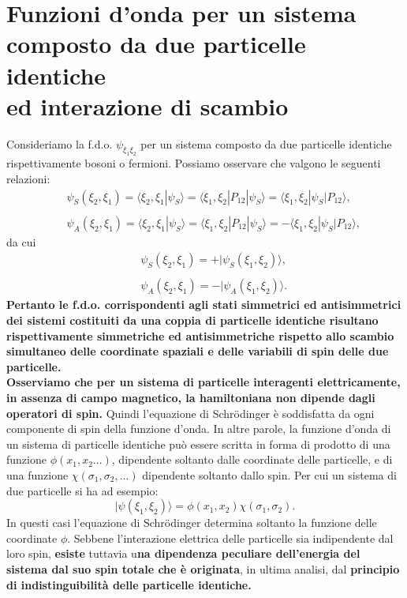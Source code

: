 \section{Funzioni d'onda per un sistema\\ composto da due particelle identiche\\ ed interazione di scambio}
Consideriamo la f.d.o. $\psi_{\xi_1 \xi_2}$ per un sistema composto da due particelle identiche rispettivamente bosoni o fermioni. Possiamo osservare che valgono le seguenti relazioni:
\begin{eqnarray}
& &\psi_S (\xi_2, \xi_1) =\langle \xi_2, \xi_1|\psi_S\rangle= \langle \xi_1, \xi_2|P_{12}|\psi_S\rangle=\langle \xi_1, \xi_2|\psi_S|P_{12}\rangle  , \\ 
\nonumber \\
& & \psi_A (\xi_2, \xi_1) =\langle \xi_2, \xi_1|\psi_S\rangle= \langle \xi_1, \xi_2|P_{12}|\psi_S\rangle=-\langle \xi_1, \xi_2|\psi_S|P_{12}\rangle ,
\end{eqnarray}
da cui
\begin{eqnarray}
& &\psi_S (\xi_2, \xi_1) = +|\psi_S(\xi_1, \xi_2)\rangle ,\\
 \nonumber \\
& &\psi_A (\xi_2, \xi_1) = -|\psi_A(\xi_1, \xi_2)\rangle .
\end{eqnarray}
\textbf{Pertanto le f.d.o. corrispondenti agli stati simmetrici ed antisimmetrici dei sistemi costituiti da una coppia di particelle identiche risultano rispettivamente simmetriche ed antisimmetriche rispetto allo scambio simultaneo delle coordinate spaziali e delle variabili di spin delle due particelle.}\\
\textbf{Osserviamo che per un sistema di particelle interagenti elettricamente, in assenza di campo magnetico, la hamiltoniana non dipende dagli operatori di spin.} Quindi l'equazione di Schr\"{o}dinger è soddisfatta da ogni componente di spin della funzione d'onda. In altre parole, la funzione d'onda di un sistema di particelle identiche può essere scritta in forma di prodotto di una funzione $\phi(x_1, x_2...)$, dipendente soltanto dalle coordinate delle particelle, e di una funzione $\chi(\sigma_1,\sigma_2,...)$ dipendente soltanto dallo spin. Per cui un sistema di due particelle si ha ad esempio:
\begin{equation}
|\psi(\xi_1, \xi_2)\rangle= \phi(x_1, x_2)\chi(\sigma_1, \sigma_2) .
\end{equation}
In questi casi l'equazione di Schr\"{o}dinger determina soltanto la funzione delle coordinate $\phi$. Sebbene l'interazione elettrica delle particelle sia indipendente dal loro spin, \textbf{esiste} tuttavia u\textbf{na dipendenza peculiare dell'energia del sistema dal suo spin totale che è originata}, in ultima analisi, dal \textbf{principio di indistinguibilità delle particelle identiche.}\\
